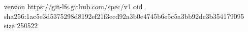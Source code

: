 version https://git-lfs.github.com/spec/v1
oid sha256:1ac5e3d5375298d8192ef21f3eed92a3b0e4745b6e5c5a3bb92dc3b354179095
size 250522
